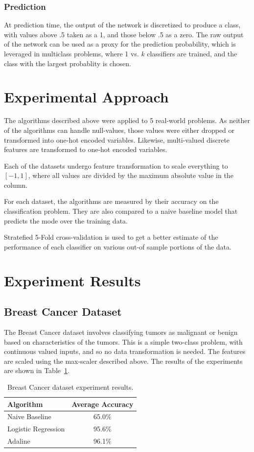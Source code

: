 \documentclass{amsart}
\begin{document}
    \subsubsection*{Prediction}
    At prediction time, the output of the network is discretized to produce a class, with values above .5 taken
    as a 1, and those below .5 as a zero. The raw output of the network can be used as a proxy for the prediction probability,
    which is leveraged in multiclass problems, where 1 vs. $k$ classifiers are trained, and the class with the
    largest probablity is chosen.

    \section{Experimental Approach}
    The algorithms described above were applied to 5 real-world problems. As neither of the algorithms can
    handle null-values, those values were either dropped or transformed into one-hot encoded variables. Likewise,
    multi-valued discrete features are transformed to one-hot encoded variables.

    Each of the datasets undergo feature transformation to scale everything to $[-1,1]$, where
    all values are divided by the maximum absolute value in the column.

    For each dataset, the algorithms are measured by their accuracy on the classification problem. They are also compared
    to a naive baseline model that predicts the mode over the training data.

    Stratefied 5-Fold cross-validation is used to get a better estimate of the performance of each classifier on
    various out-of sample portions of the data.

    \section{Experiment Results}
    \subsection{Breast Cancer Dataset}
    The Breast Cancer dataset\cite{cancerdataset} involves classifying tumors as malignant or benign based
    on characteristics of the tumors. This is a simple two-class problem, with continuous valued inputs, and
    so no data transformation is needed. The features are scaled using the max-scaler described above.
    The results of the experiments are shown in Table~\ref{breast_results}.
    \begin{table}[H]
    \begin{tabular}{lc}
    Algorithm & Average Accuracy \\
    \hline
    Naive Baseline & 65.0\% \\
    Logistic Regression & 95.6\% \\
    Adaline & 96.1\%
    \end{tabular}
    \caption{Breast Cancer dataset experiment results.}
    \label{breast_results}
    \end{table}
\end{document}
